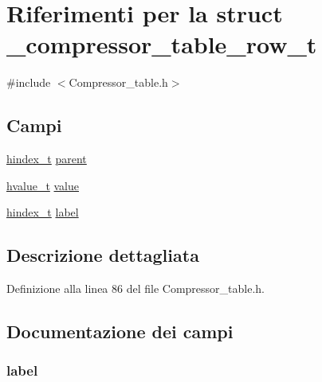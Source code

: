 \hypertarget{struct__compressor__table__row__t}{\section{Riferimenti per la struct \-\_\-compressor\-\_\-table\-\_\-row\-\_\-t}
\label{struct__compressor__table__row__t}
}


{\ttfamily \#include $<$Compressor\-\_\-table.\-h$>$}

\subsection*{Campi}
\begin{DoxyCompactItemize}
\item 
\hyperlink{_common_8h_a9e5efd01ad4bc79efcef95aee756b06a}{hindex\-\_\-t} \hyperlink{struct__compressor__table__row__t_afcbfa18627869ca8efe6e3e9d1fcceb3}{parent}
\item 
\hyperlink{_common_8h_a59e7e401edd661023c103ec038bc4ab2}{hvalue\-\_\-t} \hyperlink{struct__compressor__table__row__t_ab069f2f375ef177b2e783fed615c001e}{value}
\item 
\hyperlink{_common_8h_a9e5efd01ad4bc79efcef95aee756b06a}{hindex\-\_\-t} \hyperlink{struct__compressor__table__row__t_aea763d08cd13a88b5965c85742700197}{label}
\end{DoxyCompactItemize}


\subsection{Descrizione dettagliata}


Definizione alla linea 86 del file Compressor\-\_\-table.\-h.



\subsection{Documentazione dei campi}
\hypertarget{struct__compressor__table__row__t_aea763d08cd13a88b5965c85742700197}{
\subsubsection[{label}]{ label}}\label{struct__compressor__table__row__t_aea763d08cd13a88b5965c85742700197}


